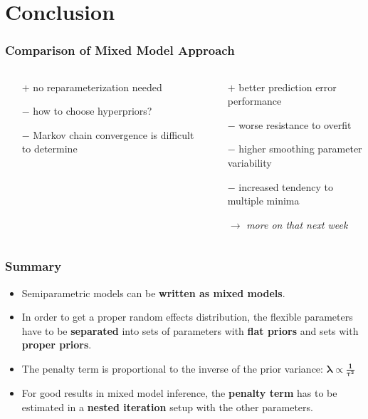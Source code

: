\documentclass[final]{beamer}
\begin{document}
\section{Conclusion}


\begin{frame}
\frametitle{Comparison of Mixed Model Approach}
\begin{columns}[T]
\begin{column}{0.5\textwidth}
\centering{\textcolor{beamer@postercolour}{Fully Bayesian approach \\(MCMC)}}
\begin{itemize}
\item[$+$] no reparameterization needed
\item[$-$] how to choose hyperpriors?
\item[$-$] Markov chain convergence is difficult to determine
\end{itemize}
\end{column}
\begin{column}{0.5\textwidth}
\centering{\textcolor{beamer@postercolour}{Prediction error methods \\ (AIC, GCV)}}
\begin{itemize}
\item[$+$] better prediction error performance 
\item[$-$] worse resistance to overfit
\item[$-$] higher smoothing parameter variability
\item[$-$] increased tendency to multiple minima
\item[$\rightarrow$] \textit{more on that next week}
\end{itemize}
\end{column}
\end{columns}
\end{frame}







\begin{frame}
\frametitle{Summary}

\begin{itemize}
\item Semiparametric models can be \textbf{written as mixed models}.
\item In order to get a proper random effects distribution, the flexible parameters have to be \textbf{separated} into sets of parameters with \textbf{flat priors} and sets with \textbf{proper priors}.
\item The penalty term  is proportional to the inverse of the prior variance: $\mathbf{\boldsymbol{\lambda} \boldsymbol{\propto} \frac{1}{\boldsymbol{\tau}^2}}$
\item For good results in mixed model inference, the \textbf{penalty term} has to be estimated in a \textbf{nested iteration} setup with the other parameters.
\end{itemize}

\end{frame}
\end{document}
